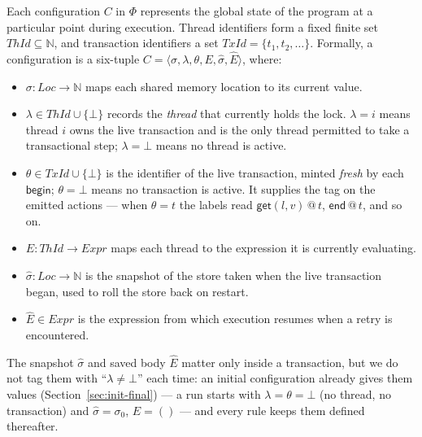 \documentclass[manuscript,nonacm]{acmart}
\makeatletter
\theoremstyle{acmdefinition}
\newcommand{\Loc}{\mathit{Loc}}
\newcommand{\TrId}{\mathit{TxId}}   %
\newcommand{\ThId}{\mathit{ThId}}   %
\newcommand{\Expr}{\mathit{Expr}}
\newcommand{\bbegin}{\textsf{begin}}
\newcommand{\eend}{\textsf{end}}
\newcommand{\getev}[3]{\textsf{get}(#1,#2)\,@\,#3}
\makeatother
\begin{document}
Each configuration $C$ in $\Phi$ represents the global state of the program at a particular point during execution. Thread identifiers form a fixed finite set $\ThId \subseteq \mathbb{N}$, and transaction identifiers a set $\TrId = \{t_1, t_2, \dots\}$. Formally, a configuration is a six-tuple $C = \langle\sigma,\lambda,\theta,E,\hat{\sigma},\hat{E}\rangle$, where:

\begin{itemize}

\item \(\sigma : \Loc \rightarrow \mathbb{N}\) maps each shared memory location to its current value.

\item \(\lambda \in \ThId \cup \{\bot\}\) records the \emph{thread} that currently holds the lock. $\lambda = i$ means thread $i$ owns the live transaction and is the only thread permitted to take a transactional step; $\lambda = \bot$ means no thread is active.

\item \(\theta \in \TrId \cup \{\bot\}\) is the identifier of the live transaction, minted \emph{fresh} by each $\bbegin$; $\theta = \bot$ means no transaction is active. It supplies the tag on the emitted actions --- when $\theta = t$ the labels read $\getev{l}{v}{t}$, $\eend\,@\,t$, and so on.

\item $E : \ThId \rightarrow \Expr$ maps each thread to the expression it is currently evaluating.

\item $\hat{\sigma}: \Loc \rightarrow \mathbb{N}$ is the snapshot of the store taken when the live transaction began, used to roll the store back on restart.

\item $\hat{E} \in \Expr$ is the expression from which execution resumes when a retry is encountered.

\end{itemize}

The snapshot $\hat{\sigma}$ and saved body $\hat{E}$ matter only inside a transaction, but we do not tag them with ``$\lambda \neq \bot$'' each time: an initial configuration already gives them values (Section~\ref{sec:init-final}) --- a run starts with $\lambda = \theta = \bot$ (no thread, no transaction) and $\hat{\sigma} = \sigma_0$, $\hat{E} = ()$ --- and every rule keeps them defined thereafter.
\end{document}
